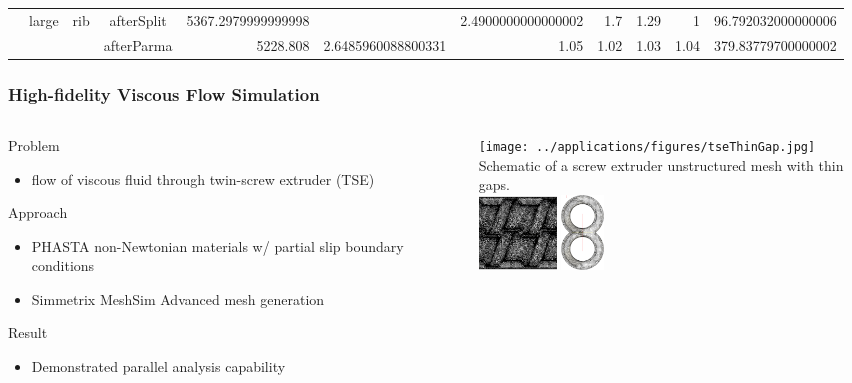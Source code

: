 \documentclass{beamer}
\begin{document}
\begin{frame}
\begin{tabular}{ c c c c N{4}{2} N{4}{2} N{1}{2} N{1}{2} N{1}{2} N{1}{2} N{3}{2} }
           & large   & rib    & afterSplit & 5367.2979999999998 &                     & 2.4900000000000002          & 1.7                         & 1.29                        & 1                           & 96.792032000000006\\
           &         &        & afterParma & 5228.808           & 2.6485960088800331  & 1.05                        & 1.02                        & 1.03                        & 1.04                        & 379.83779700000002\\
  \end{tabular}
\end{frame}

\begin{frame}
  \frametitle{High-fidelity Viscous Flow Simulation}
  \begin{columns}
    \begin{column}{0.5\textwidth}
      Problem
      \begin{itemize}
        \item flow of viscous fluid through twin-screw extruder (TSE)
      \end{itemize}
      Approach
      \begin{itemize}
        \item PHASTA non-Newtonian materials w/ partial slip boundary conditions
        \item Simmetrix MeshSim Advanced mesh generation
      \end{itemize}
      Result
      \begin{itemize}
        \item Demonstrated parallel analysis capability
      \end{itemize}
    \end{column}
    \begin{column}{0.5\textwidth}
      \centering
      \texttt{[image: ../applications/figures/tseThinGap.jpg]}\\
      \small
      Schematic of a screw extruder unstructured mesh with thin gaps.\\
      \includegraphics[height=2.0cm,keepaspectratio]{../applications/figures/tseMeshTwoThreads.png}
      \includegraphics[height=2.0cm,keepaspectratio]{../applications/figures/tseMeshCrossSection.png}\\

\end{column}
\end{columns}
\end{frame}
\end{document}
